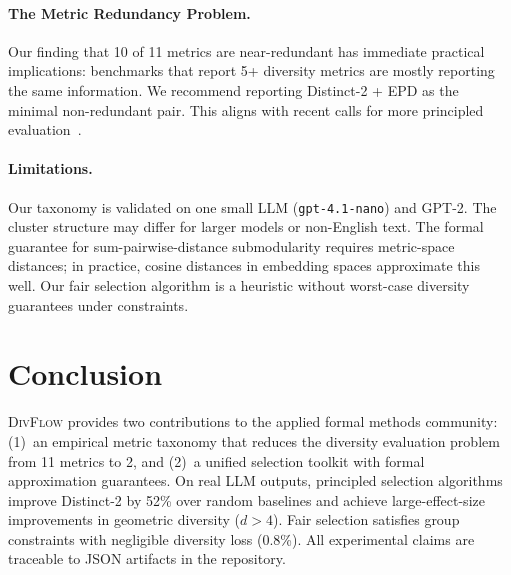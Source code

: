 \documentclass[11pt]{article}
\begin{document}
\paragraph{The Metric Redundancy Problem.}
Our finding that 10 of 11 metrics are near-redundant has immediate
practical implications: benchmarks that report 5+ diversity metrics
are mostly reporting the same information. We recommend reporting
Distinct-2 + EPD as the minimal non-redundant pair. This aligns
with recent calls for more principled evaluation~\citep{tevet2021evaluating}.

\paragraph{Limitations.}
Our taxonomy is validated on one small LLM (\texttt{gpt-4.1-nano})
and GPT-2. The cluster structure may differ for larger models or
non-English text. The formal guarantee for sum-pairwise-distance
submodularity requires metric-space distances; in practice, cosine
distances in embedding spaces approximate this well. Our fair selection
algorithm is a heuristic without worst-case diversity guarantees
under constraints.

\section{Conclusion}

\textsc{DivFlow} provides two contributions to the applied formal
methods community: (1)~an empirical metric taxonomy that reduces the
diversity evaluation problem from 11 metrics to 2, and (2)~a unified
selection toolkit with formal approximation guarantees. On real LLM
outputs, principled selection algorithms improve Distinct-2 by 52\%
over random baselines and achieve large-effect-size improvements in
geometric diversity ($d > 4$). Fair selection satisfies group constraints
with negligible diversity loss (0.8\%). All experimental claims are
traceable to JSON artifacts in the repository.



\end{document}
